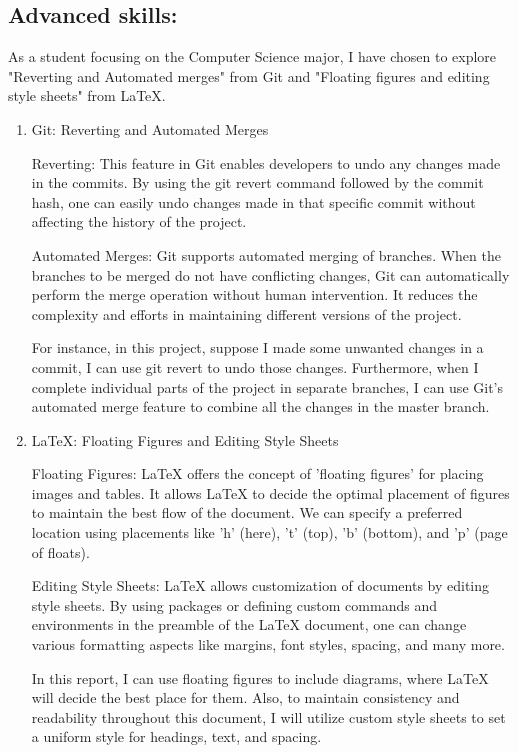 \documentclass[a4paper, 11pt]{report}
\begin{document}
\subsection{Advanced skills: \studA}

As a student focusing on the Computer Science major, I have chosen to explore "Reverting and Automated merges" from Git and "Floating figures and editing style sheets" from LaTeX.

\begin{enumerate}
    
\item  Git: Reverting and Automated Merges

Reverting: This feature in Git enables developers to undo any changes made in the commits. By using the git revert command followed by the commit hash, one can easily undo changes made in that specific commit without affecting the history of the project.

Automated Merges: Git supports automated merging of branches. When the branches to be merged do not have conflicting changes, Git can automatically perform the merge operation without human intervention. It reduces the complexity and efforts in maintaining different versions of the project.

For instance, in this project, suppose I made some unwanted changes in a commit, I can use git revert to undo those changes. Furthermore, when I complete individual parts of the project in separate branches, I can use Git's automated merge feature to combine all the changes in the master branch.

\item  LaTeX: Floating Figures and Editing Style Sheets

Floating Figures: LaTeX offers the concept of 'floating figures' for placing images and tables. It allows LaTeX to decide the optimal placement of figures to maintain the best flow of the document. We can specify a preferred location using placements like 'h' (here), 't' (top), 'b' (bottom), and 'p' (page of floats).

Editing Style Sheets: LaTeX allows customization of documents by editing style sheets. By using packages or defining custom commands and environments in the preamble of the LaTeX document, one can change various formatting aspects like margins, font styles, spacing, and many more.

In this report, I can use floating figures to include diagrams, where LaTeX will decide the best place for them. Also, to maintain consistency and readability throughout this document, I will utilize custom style sheets to set a uniform style for headings, text, and spacing.

\end{enumerate}
\end{document}
